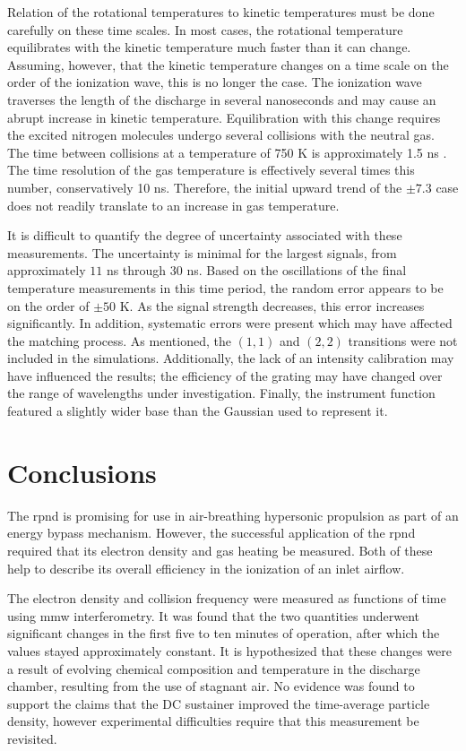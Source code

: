 Relation of the rotational temperatures to kinetic temperatures must be done
carefully on these time scales. In most cases, the rotational temperature
equilibrates with the kinetic temperature much faster than it can change.
Assuming, however, that the kinetic temperature changes on a time scale on the
order of the ionization wave, this is no longer the case. The ionization wave
traverses the length of the discharge in several nanoseconds and may cause an
abrupt increase in kinetic temperature. Equilibration with this change requires
the excited nitrogen molecules undergo several collisions with the neutral gas.
The time between collisions at a temperature of 750 K is approximately 1.5 ns
\cite{Hasegawa1987}. The time resolution of the gas temperature is effectively
several times this number, conservatively 10 ns. Therefore, the initial upward
trend of the $\pm 7.3$ case does not readily translate to an increase in gas
temperature.

It is difficult to quantify the degree of uncertainty associated with these
measurements. The uncertainty is minimal for the largest signals, from
approximately $11$ ns through $30$ ns. Based on the oscillations of the final
temperature measurements in this time period, the random error appears to be on
the order of $\pm50$ K. As the signal strength decreases, this error increases
significantly. In addition, systematic errors were present which may have
affected the matching process. As mentioned, the $(1,1)$ and $(2,2)$ transitions
were not included in the simulations. Additionally, the lack of an intensity
calibration may have influenced the results; the efficiency of the grating may
have changed over the range of wavelengths under investigation. Finally, the
instrument function featured a slightly wider base than the Gaussian used to
represent it.

\section{Conclusions}

The \acs{rpnd} is promising for use in air-breathing hypersonic propulsion as
part of an energy bypass mechanism. However, the successful application of the
\acs{rpnd} required that its electron density and gas heating be measured. Both
of these help to describe its overall efficiency in the ionization of an inlet
airflow.

The electron density and collision frequency were measured as functions of time
using \acs{mmw} interferometry. It was found that the two quantities underwent
significant changes in the first five to ten minutes of operation, after which
the values stayed approximately constant. It is hypothesized that these changes
were a result of evolving chemical composition and temperature in the discharge
chamber, resulting from the use of stagnant air. No evidence was found to
support the claims that the DC sustainer improved the time-average particle
density, however experimental difficulties require that this measurement be
revisited.

